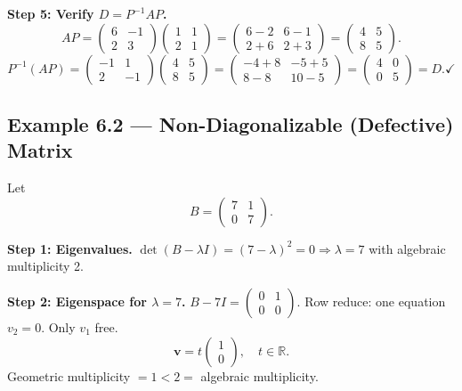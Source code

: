 \documentclass[12pt,a4paper]{article}
\begin{document}
\textbf{Step 5: Verify $D = P^{-1}AP$.}
\[
  AP = \begin{pmatrix}6&-1\\2&3\end{pmatrix}\begin{pmatrix}1&1\\2&1\end{pmatrix}
     = \begin{pmatrix}6-2&6-1\\2+6&2+3\end{pmatrix}
     = \begin{pmatrix}4&5\\8&5\end{pmatrix}.
\]
\[
  P^{-1}(AP) = \begin{pmatrix}-1&1\\2&-1\end{pmatrix}\begin{pmatrix}4&5\\8&5\end{pmatrix}
              = \begin{pmatrix}-4+8&-5+5\\8-8&10-5\end{pmatrix}
              = \begin{pmatrix}4&0\\0&5\end{pmatrix} = D. \checkmark
\]

\subsection*{Example 6.2 --- Non-Diagonalizable (Defective) Matrix}

Let
\[
  B = \begin{pmatrix} 7 & 1 \\ 0 & 7 \end{pmatrix}.
\]

\textbf{Step 1: Eigenvalues.}
$\det(B-\lambda I) = (7-\lambda)^2 = 0 \Rightarrow \lambda = 7$ with algebraic multiplicity 2.

\textbf{Step 2: Eigenspace for $\lambda = 7$.}
$B - 7I = \begin{pmatrix}0&1\\0&0\end{pmatrix}$. Row reduce: one equation $v_2 = 0$. Only $v_1$ free.
\[
  \mathbf{v} = t\begin{pmatrix}1\\0\end{pmatrix}, \quad t \in \mathbb{R}.
\]
Geometric multiplicity $= 1 < 2 =$ algebraic multiplicity.
\end{document}
